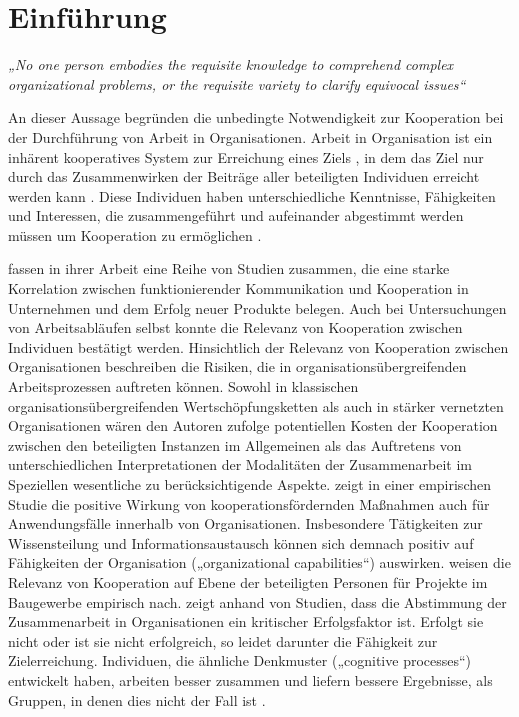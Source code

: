 \chapter{Einführung} %
\label{cha:einführung}

\emph{„No one person embodies the requisite knowledge to comprehend complex organizational problems, or the requisite variety to clarify equivocal issues“} \citep{Tyre97}

An dieser Aussage begründen \citeauthor{Tyre97} die unbedingte Notwendigkeit zur Kooperation bei der Durchführung von Arbeit in Organisationen. Arbeit in Organisation ist ein inhärent kooperatives System \citep{Helmberger62} zur Erreichung eines Ziels \citep{Semmer04}, in dem das Ziel nur durch das Zusammenwirken der Beiträge aller beteiligten Individuen erreicht werden kann \citep{Strauss85} \citep{Tyre97}. Diese Individuen haben unterschiedliche Kenntnisse, Fähigkeiten und Interessen, die zusammengeführt und aufeinander abgestimmt werden müssen um Kooperation zu ermöglichen \citep{Schmidt94}.

\citet{Griffin92} fassen in ihrer Arbeit eine Reihe von Studien zusammen, die eine starke Korrelation zwischen funktionierender Kommunikation und Kooperation in Unternehmen und dem Erfolg neuer Produkte belegen. Auch bei Untersuchungen von Arbeitsabläufen selbst konnte die Relevanz von Kooperation zwischen Individuen bestätigt werden. Hinsichtlich der Relevanz von Kooperation zwischen Organisationen beschreiben \citet{Kumar96} die Risiken, die in organisationsübergreifenden Arbeitsprozessen auftreten können. Sowohl in klassischen organisationsübergreifenden Wertschöpfungsketten als auch in stärker vernetzten Organisationen wären den Autoren zufolge potentiellen Kosten der Kooperation zwischen den beteiligten Instanzen im Allgemeinen als das Auftretens von unterschiedlichen Interpretationen der Modalitäten der Zusammenarbeit im Speziellen wesentliche zu berücksichtigende Aspekte. \citet{Tsai02} zeigt in einer empirischen Studie die positive Wirkung von kooperationsfördernden Maßnahmen auch für Anwendungsfälle innerhalb von Organisationen. Insbesondere Tätigkeiten zur Wissensteilung und Informationsaustausch können sich demnach positiv auf Fähigkeiten der Organisation („organizational capabilities“) auswirken. \citet{Phua04} weisen die Relevanz von Kooperation auf Ebene der beteiligten Personen für Projekte im Baugewerbe empirisch nach. \citet{Roy01} zeigt anhand von Studien, dass die Abstimmung der Zusammenarbeit in Organisationen ein kritischer Erfolgsfaktor ist. Erfolgt sie nicht oder ist sie nicht erfolgreich, so leidet darunter die Fähigkeit zur Zielerreichung. Individuen, die ähnliche Denkmuster („cognitive processes“) entwickelt haben, arbeiten besser zusammen und liefern bessere Ergebnisse, als Gruppen, in denen dies nicht der Fall ist \citep{Roy01}. 

